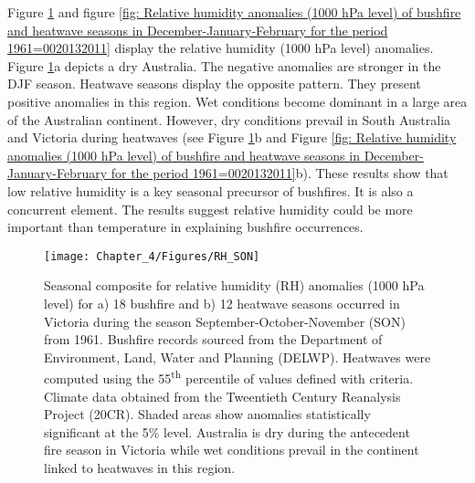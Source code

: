 Figure \ref{fig: Relative humidity anomalies (1000 hPa level) of bushfire and heatwave seasons in September-October-November for the period 1961=0020132011}
and figure \ref{fig: Relative humidity anomalies (1000 hPa level) of bushfire and heatwave seasons in December-January-February for the period 1961=0020132011}
display the relative humidity (1000 hPa level) anomalies. Figure \ref{fig: Relative humidity anomalies (1000 hPa level) of bushfire and heatwave seasons in September-October-November for the period 1961=0020132011}a
depicts a dry Australia. The negative anomalies are stronger in the
DJF season. Heatwave seasons display the opposite pattern. They present
positive anomalies in this region. Wet conditions become dominant
in a large area of the Australian continent. However, dry conditions
prevail in South Australia and Victoria during heatwaves (see Figure
\ref{fig: Relative humidity anomalies (1000 hPa level) of bushfire and heatwave seasons in September-October-November for the period 1961=0020132011}b
and Figure \ref{fig: Relative humidity anomalies (1000 hPa level) of bushfire and heatwave seasons in December-January-February for the period 1961=0020132011}b).
These results show that low relative humidity is a key seasonal precursor
of bushfires. It is also a concurrent element. The results suggest
relative humidity could be more important than temperature in explaining
bushfire occurrences. 

\begin{figure}[h]
\noindent \begin{centering}
\texttt{[image: Chapter\_4/Figures/RH\_SON]}
\par\end{centering}

\caption[Seasonal composite for relative humidity (RH) anomalies (1000 hPa
level) for a) 18 bushfire and b) 12 heatwave seasons occurred in Victoria during  the
season September-October-November (SON) from 1961.]{Seasonal composite for relative humidity (RH) anomalies (1000 hPa
level) for a) 18 bushfire and b) 12 heatwave seasons occurred in Victoria during  the
season September-October-November (SON) from 1961.
Bushfire records sourced from the Department of Environment, Land,
Water and Planning (DELWP). Heatwaves were computed using the 55\protect\textsuperscript{th}
percentile of values defined with \citet{Nairn2009} criteria. Climate
data obtained from the Tweentieth Century Reanalysis Project (20CR).
Shaded areas show anomalies statistically significant at the 5\% level.
Australia is dry during the antecedent fire season in Victoria while
wet conditions prevail in the continent linked to heatwaves in this
region.\label{fig: Relative humidity anomalies (1000 hPa level) of bushfire and heatwave seasons in September-October-November for the period 1961=0020132011}}


\end{figure}


